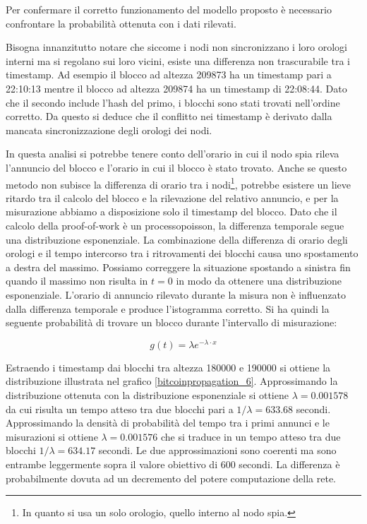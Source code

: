 Per confermare il corretto funzionamento del modello proposto è necessario confrontare la probabilità ottenuta con i dati rilevati.

Bisogna innanzitutto notare che siccome i nodi non sincronizzano i loro orologi interni ma si regolano sui loro vicini, esiste una differenza non trascurabile tra i timestamp. Ad esempio il blocco ad altezza 209873 ha un timestamp pari a 22:10:13 mentre il blocco ad altezza 209874 ha un timestamp di 22:08:44. Dato che il secondo include l'hash del primo, i blocchi sono stati trovati nell'ordine corretto. Da questo si deduce che il conflitto nei timestamp è derivato dalla mancata sincronizzazione degli orologi dei nodi.

In questa analisi si potrebbe tenere conto dell'orario in cui il nodo spia rileva l'annuncio del blocco e l'orario in cui il blocco è stato trovato. Anche se questo metodo non subisce la differenza di orario tra i nodi\footnote{In quanto si usa un solo orologio, quello interno al nodo spia.}, potrebbe esistere un lieve ritardo tra il calcolo del blocco e la rilevazione del relativo annuncio, e per la misurazione abbiamo a disposizione solo il timestamp del blocco. Dato che il calcolo della proof-of-work è un \gls{processopoisson}, la differenza temporale segue una distribuzione esponenziale. La combinazione della differenza di orario degli orologi e il tempo intercorso tra i ritrovamenti dei blocchi causa uno spostamento a destra del massimo. Possiamo correggere la situazione spostando a sinistra fin quando il massimo non risulta in $t=0$ in modo da ottenere una distribuzione esponenziale. L'orario di annuncio rilevato durante la misura non è influenzato dalla differenza temporale e produce l'istogramma corretto. Si ha quindi la seguente probabilità di trovare un blocco durante l'intervallo di misurazione:

\[ g(t) = \lambda e^{-\lambda \cdot x}\]

Estraendo i timestamp dai blocchi tra altezza 180000 e 190000 si ottiene la distribuzione illustrata nel grafico \ref{bitcoinpropagation_6}. Approssimando la distribuzione ottenuta con la distribuzione esponenziale si ottiene $\lambda = 0.001578$ da cui risulta un tempo atteso tra due blocchi pari a $1 / \lambda = 633.68$ secondi. Approssimando la densità di probabilità del tempo tra i primi annunci e le misurazioni si ottiene $\lambda = 0.001576$ che si traduce in un tempo atteso tra due blocchi $1/ \lambda = 634.17$ secondi. Le due approssimazioni sono coerenti ma sono entrambe leggermente sopra il valore obiettivo di 600 secondi. La differenza è probabilmente dovuta ad un decremento del potere computazione della rete.

